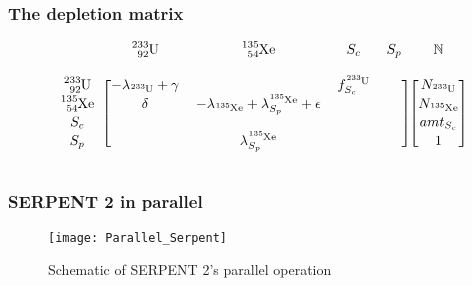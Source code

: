 \documentclass{beamer}
\def\b{\color{black}}
\begin{document}
\begin{frame}
\frametitle{The depletion matrix}
    \begin{equation*}
        \begin{blockarray}{cccccc}
             &
            \b \ce{^{233}_{92}U} &
            \b \ce{^{135}_{54}Xe} &
            \b S_{c} &
            \b S_{p} &
            \mathbb{N} \\
             &
             &
             &
             &
             &
             \\ 
        \begin{block}{c[cccc][c]}
            \b \ce{^{233}_{92}U} &
            \b -\lambda_{\ce{^{233}U}} + \gamma &
             &
            \b f_{S_{c}}^{\ce{^{233}U}} &
             &
            N_{\ce{^{233}U}} \\
            \b \ce{^{135}_{54}Xe} &
            \b \delta &
            \b -\lambda_{\ce{^{135}Xe}} + \lambda_{S_{p}}^{\ce{^{135}Xe}} +
                \epsilon &
             &
             &
            N_{\ce{^{135}Xe}} \\
            \b S_{c} &
             &
             &
             &
             &
            amt_{S_{c}} \\
            \b S_{p} &
             &
            \b \lambda_{S_{p}}^{\ce{^{135}Xe}} &
             &
             &
             1\\
        \end{block}
        \end{blockarray}
    \end{equation*}

\end{frame}

\begin{frame}
\frametitle{SERPENT 2 in parallel}

    \begin{figure}
        \centering
        \texttt{[image: Parallel\_Serpent]}
        \caption{Schematic of SERPENT 2's parallel operation}
        \label{fig:parallel_serpent}
    \end{figure}

\end{frame}
\end{document}
